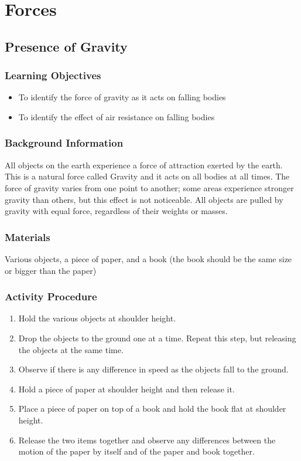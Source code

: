 \section{Forces}

\subsection{Presence of Gravity}

\subsubsection*{Learning Objectives}
\begin{itemize}
\item{To identify the force of gravity as it acts on falling bodies} 
\item{To identify the effect of air resistance on falling bodies} 
\end{itemize}

\subsubsection*{Background Information}
All objects on the earth experience a force of attraction exerted by the earth.  This is a natural force called Gravity and it acts on all bodies at all times.  The force of gravity varies from one point to another; some areas experience stronger gravity than others, but this effect is not noticeable.  All objects are pulled by gravity with equal force, regardless of their weights or masses.

\subsubsection*{Materials}
Various objects, a piece of paper, and a book (the book should be the same size or bigger than the paper)

\subsubsection*{Activity Procedure}
\begin{enumerate}
\item{Hold the various objects at shoulder height.} 
\item{Drop the objects to the ground one at a time. Repeat this step, but releasing the objects at the same time.} 
\item{Observe if there is any difference in speed as the objects fall to the ground.} 
\item{Hold a piece of paper at shoulder height and then release it.} 
\item{Place a piece of paper on top of a book and hold the book flat at shoulder height.} 
\item{Release the two items together and observe any differences between the motion of the paper by itself and of the paper and book together.} 
\end{enumerate}

